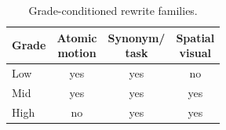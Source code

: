 \begin{table}
\centering
\normalsize
\setlength{\parskip}{0pt}
\setlength{\abovecaptionskip}{0pt}
\setlength{\belowcaptionskip}{\baselineskip}
\caption{\centering Grade-conditioned rewrite families.}
\label{tab:grade-policies}
\nointerlineskip
\setlength{\tabcolsep}{2.0pt}
\begin{tabular}{@{}lccc@{}}
\toprule
Grade & \shortstack{Atomic\\motion} & \shortstack{Synonym/\\task} & \shortstack{Spatial\\visual} \\
\midrule
Low & yes & yes & no \\
Mid & yes & yes & yes \\
High & no & yes & yes \\
\bottomrule
\end{tabular}
\end{table}
